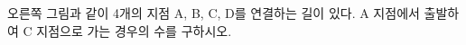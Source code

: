 \noindent\begin{minipage}[t]{0.58\linewidth}\vspace{0pt}\raggedright 오른쪽 그림과 같이 4개의 지점 A, B, C, D를 연결하는 길이 있다. A 지점에서 출발하여 C 지점으로 가는 경우의 수를 구하시오. \end{minipage}\hfill\begin{minipage}[t]{0.4\linewidth}\vspace{0pt}\centering \resizebox{\ifdim\width>\linewidth\linewidth\else\width\fi}{!}{}\end{minipage}\par
